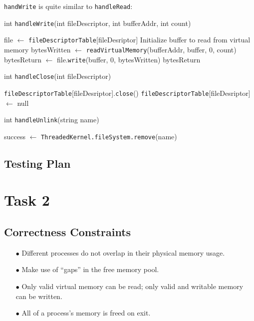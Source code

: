 \documentclass{article}
\begin{document}
\begin{spacing}{1.1}
\texttt{handWrite} is quite similar to \texttt{handleRead}:

\begin{algorithm}
  \caption{int \texttt{handleWrite}(int fileDescriptor, int bufferAddr, int count)}
\begin{algorithmic}[1]
  \ENDIF
  \STATE file $\leftarrow$ \texttt{fileDescriptorTable}[fileDesriptor]
  \ENDIF
  \STATE Initialize buffer to read from virtual memory
  \STATE bytesWritten $\leftarrow$ \texttt{readVirtualMemory}(bufferAddr, buffer, 0, count)
  \ENDIF
  \STATE bytesReturn $\leftarrow$ file.\texttt{write}(buffer, 0, bytesWritten)
  \ENDIF
  \RETURN bytesReturn
\end{algorithmic}
\end{algorithm}

\begin{algorithm}
  \caption{int \texttt{handleClose}(int fileDescriptor)}
\begin{algorithmic}[1]
  \ENDIF
  \STATE \texttt{fileDescriptorTable}[fileDesriptor].\texttt{close}()
  \STATE  \texttt{fileDescriptorTable}[fileDesriptor] $\leftarrow$ null
\end{algorithmic}
\end{algorithm}

\begin{algorithm}
  \caption{int \texttt{handleUnlink}(string name)}
\begin{algorithmic}[1]
  \STATE  success $\leftarrow$ \texttt{ThreadedKernel.fileSystem.remove}(name)
  \ENDIF
\end{algorithmic}
\end{algorithm}



\subsection{Testing Plan}


\section{Task 2}

\subsection{Correctness Constraints}
\begin{enumerate}
  \item[$\bullet$] Different processes do not overlap in their physical memory usage.
  \item[$\bullet$] Make use of ``gaps'' in the free memory pool.
  \item[$\bullet$] Only valid virtual memory can be read; only valid and writable
    memory can be written.
  \item[$\bullet$] All of a process's memory is freed on exit.
\end{enumerate}


\end{spacing}
\end{document}
